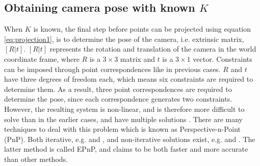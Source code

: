 \subsection{Obtaining camera pose with known $K$} \label{camera-pose}
When $K$ is known, the final step before points can be projected using equation \ref{eq:projection1}, is to determine the pose of the camera, i.e. extrinsic matrix, $[R|t]$. $[R|t]$ represents the rotation and translation of the camera in the world coordinate frame, where $R$ is a $3 \times 3$ matrix and $t$ is a $3 \times 1$ vector.
Constraints can be imposed through point correspondences like in previous cases.
$R$ and $t$ have three degrees of freedom each, which means six constraints are required to determine them.
As a result, three point correspondences are required to determine the pose, since each correspondence generates two constraints.
However, the resulting system is non-linear, and is therefore more difficult to solve than in the earlier cases, and have multiple solutions \cite[p. 187]{hartley-zisserman}. 
There are many techniques to deal with this problem which is known as Perspective-n-Point (PnP). 
Both iterative, e.g. \cite{hesch-pnp} and \cite{oberkampf-pnp}, and non-iterative solutions exist, e.g. \cite{quan-pnp} and \cite{lepetit-pnp}.
The latter method is called EPnP, and claims to be both faster and more accurate than other methods. 















